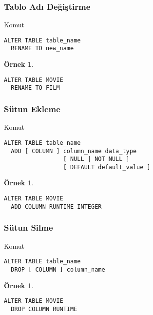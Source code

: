 \documentclass[dvipsnames]{beamer}
\theoremstyle{definition}
\theoremstyle{example}
\newtheorem{ornek}[theorem]{Örnek}
\theoremstyle{plain}
\begin{document}
\begin{frame}[fragile]
  \frametitle{Tablo Adı Değiştirme}

  \begin{block}{Komut}
    \begin{lstlisting}
ALTER TABLE table_name
  RENAME TO new_name
    \end{lstlisting}
  \end{block}

  \pause
  \medskip
  \begin{ornek}
    \begin{lstlisting}
ALTER TABLE MOVIE
  RENAME TO FILM
    \end{lstlisting}
  \end{ornek}
\end{frame}

\begin{frame}[fragile]
  \frametitle{Sütun Ekleme}

  \begin{block}{Komut}
    \begin{lstlisting}
ALTER TABLE table_name
  ADD [ COLUMN ] column_name data_type
                 [ NULL | NOT NULL ]
                 [ DEFAULT default_value ]
    \end{lstlisting}
  \end{block}

  \pause
  \medskip
  \begin{ornek}
    \begin{lstlisting}
ALTER TABLE MOVIE
  ADD COLUMN RUNTIME INTEGER
    \end{lstlisting}
  \end{ornek}
\end{frame}

\begin{frame}[fragile]
  \frametitle{Sütun Silme}

  \begin{block}{Komut}
    \begin{lstlisting}
ALTER TABLE table_name
  DROP [ COLUMN ] column_name
    \end{lstlisting}
  \end{block}

  \pause
  \medskip
  \begin{ornek}
    \begin{lstlisting}
ALTER TABLE MOVIE
  DROP COLUMN RUNTIME
    \end{lstlisting}
  \end{ornek}
\end{frame}
\end{document}
